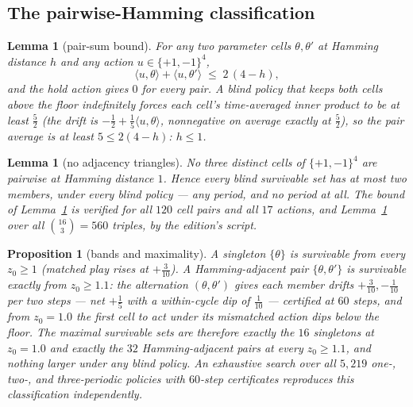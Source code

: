 \documentclass[10pt,twocolumn]{article}
\theoremstyle{plain}
\newtheorem{proposition}[theorem]{Proposition}
\newtheorem{lemma}[theorem]{Lemma}
\theoremstyle{definition}
\theoremstyle{remark}
\begin{document}
\subsection{The pairwise-Hamming classification}\label{hamming}

\begin{lemma}[pair-sum bound]\label{lem:pairsum}
For any two parameter cells \(\theta, \theta'\) at Hamming distance
\(h\) and any action \(u \in \{+1,-1\}^{4}\),
\[
\langle u, \theta\rangle + \langle u, \theta' \rangle
\;\le\; 2\,(4 - h),
\]
and the hold action gives \(0\) for every pair. A blind policy that
keeps both cells above the floor indefinitely forces each cell's
time-averaged inner product to be at least \(\tfrac52\) (the drift is
\(-\tfrac12 + \tfrac15\langle u, \theta\rangle\), nonnegative on
average exactly at \(\tfrac52\)), so the pair average is at least
\(5 \le 2(4-h)\): \(h \le 1\).
\end{lemma}

\begin{lemma}[no adjacency triangles]\label{lem:triangle}
No three distinct cells of \(\{+1,-1\}^{4}\) are pairwise at Hamming
distance \(1\). Hence every blind survivable set has at most two
members, under every blind policy --- any period, and no period at
all. The bound of Lemma~\ref{lem:pairsum} is verified for all
\(120\) cell pairs and all \(17\) actions, and
Lemma~\ref{lem:triangle} over all \(\binom{16}{3} = 560\) triples, by
the edition's script.
\end{lemma}

\begin{proposition}[bands and maximality]\label{prop:bands}
A singleton \(\{\theta\}\) is survivable from every \(z_{0} \ge 1\)
(matched play rises at \(+\tfrac3{10}\)). A Hamming-adjacent pair
\(\{\theta, \theta'\}\) is survivable exactly from
\(z_{0} \ge 1.1\): the alternation \((\theta, \theta')\) gives each
member drifts \(+\tfrac3{10}, -\tfrac1{10}\) per two steps --- net
\(+\tfrac15\) with a within-cycle dip of \(\tfrac1{10}\) --- certified
at \(60\) steps, and from \(z_{0} = 1.0\) the first cell to act under
its mismatched action dips below the floor. The maximal survivable
sets are therefore exactly the \(16\) singletons at \(z_{0} = 1.0\)
and exactly the \(32\) Hamming-adjacent pairs at every
\(z_{0} \ge 1.1\), and nothing larger under any blind policy. An
exhaustive search over all \(5{,}219\) one-, two-, and three-periodic
policies with \(60\)-step certificates reproduces this classification
independently.
\end{proposition}
\end{document}
